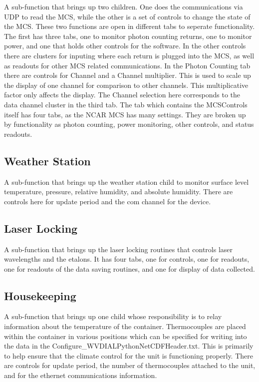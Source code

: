 A sub-function that brings up two children. One does the communications via UDP to read the MCS, while the other is a set of controls to change the state of the MCS. These two functions are open in different tabs to seperate functionality. The first has three tabs, one to monitor photon counting returns, one to monitor power, and one that holds other controls for the software. In the other controls there are clusters for inputing where each return is plugged into the MCS, as well as readouts for other MCS related communications. In the Photon Counting tab there are controls for Channel and a Channel multiplier. This is used to scale up the display of one channel for comparison to other channels. This multiplicative factor only affects the display. The Channel selection here corresponds to the data channel cluster in the third tab. The tab which contains the MCSControls itself has four tabs, as the NCAR MCS has many settings. They are broken up by functionality as photon counting, power monitoring, other controls, and status readouts. 

\subsection{Weather Station}\label{Sec:WSSubFunction}

A sub-function that brings up the weather station child to monitor surface level temperature, pressure, relative humidity, and absolute humidity. There are controls here for update period and the com channel for the device. 

\subsection{Laser Locking}\label{Sec:LLSubFunction}

A sub-function that brings up the laser locking routines that controls laser wavelengths and the etalons. It has four tabs, one for controls, one for readouts, one for readouts of the data saving routines, and one for display of data collected. 

\subsection{Housekeeping}\label{Sec:HousekeepingSubFunction}

A sub-function that brings up one child whose responsibility is to relay information about the temperature of the container. Thermocouples are placed within the container in various positions which can be specified for writing into the data in the Configure\_WVDIALPythonNetCDFHeader.txt. This is primarily to help ensure that the climate control for the unit is functioning properly. There are controls for update period, the number of thermocouples attached to the unit, and for the ethernet communications information. 

